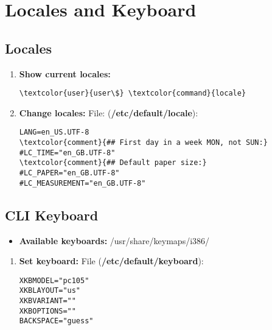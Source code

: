 \documentclass[10pt, a4paper, onecolumn, openany]{book} %
\begin{document}
\section{Locales and Keyboard}
\subsection{Locales}
\begin{enumerate}
    \item \textbf{Show current locales:}
\begin{Verbatim}[commandchars=\\\{\}]
\textcolor{user}{user\$} \textcolor{command}{locale}
\end{Verbatim}
    \item \textbf{Change locales:}
\newline File: (\textbf{\textcolor{file}{/etc/default/locale}}):
\begin{Verbatim}[commandchars=\\\{\}]
LANG=en_US.UTF-8
\textcolor{comment}{## First day in a week MON, not SUN:}
#LC_TIME="en_GB.UTF-8"
\textcolor{comment}{## Default paper size:}
#LC_PAPER="en_GB.UTF-8"
#LC_MEASUREMENT="en_GB.UTF-8"
\end{Verbatim}
\end{enumerate}
\subsection{CLI Keyboard}
\begin{itemize}
    \item \textbf{Available keyboards:}
    \newline \textcolor{dir}{/usr/share/keymaps/i386/}
\end{itemize}
\begin{enumerate}
    \item \textbf{Set keyboard:}
\newline File (\textbf{\textcolor{file}{/etc/default/keyboard}}):
\begin{Verbatim}[commandchars=\\\{\}]
XKBMODEL="pc105"
XKBLAYOUT="us"
XKBVARIANT=""
XKBOPTIONS=""
BACKSPACE="guess"
\end{Verbatim}
\end{enumerate}
\end{document}
